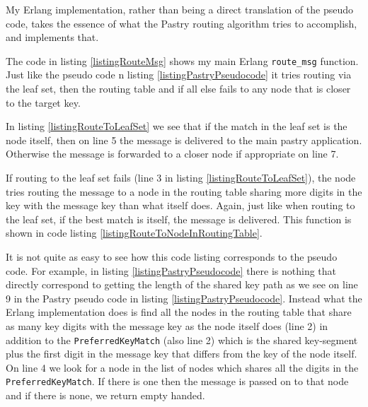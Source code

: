 My Erlang implementation, rather than being a direct translation of the pseudo code, takes the essence of what the Pastry routing algorithm tries to accomplish, and implements that.

The code in listing \ref{listingRouteMsg} shows my main Erlang \verb=route_msg= function. 
Just like the pseudo code n listing \ref{listingPastryPseudocode} it tries routing via the leaf set, then the routing table and if all else fails to any node that is closer to the target key.



In listing \ref{listingRouteToLeafSet} we see that if the match in the leaf set is the node itself, then on line 5 the message is delivered to the main pastry application. Otherwise the message is forwarded to a closer node if appropriate on line 7.



If routing to the leaf set fails (line 3 in listing \ref{listingRouteToLeafSet}), the node tries routing the message to a node in the routing table sharing more digits in the key with the message key than what itself does. Again, just like when routing to the leaf set, if the best match is itself, the message is delivered. This function is shown in code listing \ref{listingRouteToNodeInRoutingTable}.

It is not quite as easy to see how this code listing corresponds to the pseudo code. For example, in listing \ref{listingPastryPseudocode} there is nothing that directly correspond to getting the length of the shared key path as we see on line 9 in the Pastry pseudo code in listing \ref{listingPastryPseudocode}. Instead what the Erlang implementation does is find all the nodes in the routing table that share as many key digits with the message key as the node itself does (line 2) in addition to the \verb=PreferredKeyMatch= (also line 2) which is the shared key-segment plus the first digit in the message key that differs from the key of the node itself.
On line 4 we look for a node in the list of nodes which shares all the digits in the \verb=PreferredKeyMatch=. If there is one then the message is passed on to that node and if there is none, we return empty handed.



